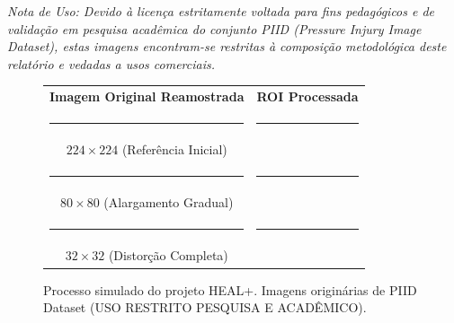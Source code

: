 \documentclass[
    12pt,
    openright,
    oneside,
    a4paper,
    chapter=TITLE,
    section=TITLE,
    brazil,
    sumario=tradicional,
    hidelinks
]{abntex2}
\begin{document}
\textit{Nota de Uso: Devido à licença estritamente voltada para fins pedagógicos e de validação em pesquisa acadêmica do conjunto PIID (Pressure Injury Image Dataset), estas imagens encontram-se restritas à composição metodológica deste relatório e vedadas a usos comerciais.}

\begin{figure}[h]
    \centering
    \begin{tabular}{cc}
         \textbf{Imagem Original Reamostrada} & \textbf{ROI Processada} \\
         \rule{4cm}{3cm} & \rule{4cm}{3cm} \\
         \(224 \times 224\) (Referência Inicial) & \\
         \rule{4cm}{3cm} & \rule{4cm}{3cm} \\
         \(80 \times 80\) (Alargamento Gradual) & \\
         \rule{4cm}{3cm} & \rule{4cm}{3cm} \\
         \(32 \times 32\) (Distorção Completa) & \\
    \end{tabular}
    \caption{Processo simulado do projeto HEAL+. Imagens originárias de PIID Dataset (USO RESTRITO PESQUISA E ACADÊMICO).}
    \label{fig:exemplos_resolucao}
\end{figure}

\postextual
\end{document}
